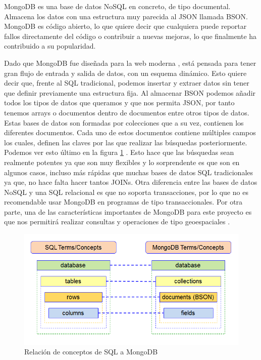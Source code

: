 MongoDB es una base de datos NoSQL en concreto, de tipo documental. Almacena los datos con una estructura muy parecida al JSON llamada BSON. MongoDB es código abierto, lo que quiere decir que cualquiera puede reportar fallos directamente del código o contribuir a nuevas mejoras, lo que finalmente ha contribuido a su popularidad.

Dado que MongoDB fue diseñada para la web moderna \cite{Mng-2}, está pensada para tener gran flujo de entrada y salida de datos, con un esquema dinámico. Esto quiere decir que, frente al SQL tradicional, podemos insertar y extraer datos sin tener que definir previamente una estructura fija. Al almacenar BSON podemos añadir todos los tipos de datos que queramos y que nos permita JSON, por tanto tenemos arrays o documentos dentro de documentos entre otros tipos de datos. Estas bases de datos son formadas por colecciones que a su vez, contienen los diferentes documentos. Cada uno de estos documentos contiene múltiples campos los cuales, definen las claves por las que realizar las búsquedas posteriormente. Podemos ver esto último en la figura \ref{Mng-img-1} \cite{Mng-5}. Esto hace que las búsquedas sean realmente potentes ya que son muy flexibles y lo sorprendente es que son en algunos casos, incluso más rápidas que muchas bases de datos SQL tradicionales ya que, no hace falta hacer tantos JOINs. Otra diferencia entre las bases de datos NoSQL y una SQL relacional es que no soporta transacciones, por lo que no es recomendable usar MongoDB en programas de tipo transaccionales. Por otra parte, una de las características importantes de MongoDB para este proyecto es que nos permitirá realizar consultas y operaciones de tipo geoespaciales \cite{Mng-3}.


\begin{figure}[htp]
\centering
\includegraphics[scale=0.57]{Imagenes/mongo1.png}
\caption{Relación de conceptos de SQL a MongoDB}
\label{Mng-img-1}
\end{figure}


